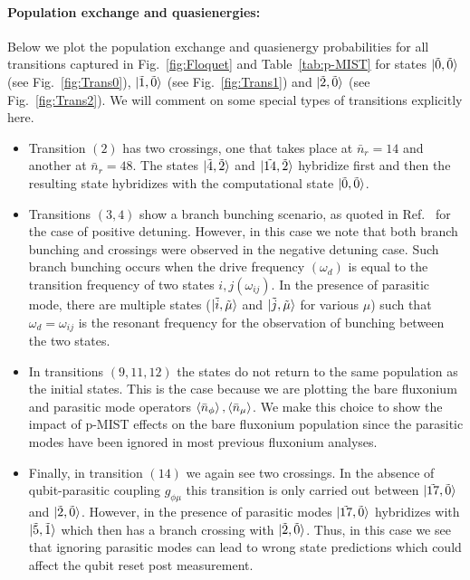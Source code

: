 \documentclass[%
reprint,
superscriptaddress,
 amsmath,amssymb,
 aps,
 prx,
longbibliography,
floatfix,
]{revtex4-2}
\begin{document}
\paragraph{Population exchange and quasienergies:}\label{app:Floquet-trans}
Below we plot the population exchange and quasienergy probabilities for all transitions captured in Fig.~\ref{fig:Floquet} and Table~\ref{tab:p-MIST} for states $\ket{\tilde{0},\tilde{0}}$ (see Fig.~\ref{fig:Trans0}), $\ket{\tilde{1},\tilde{0}}$ (see Fig.~\ref{fig:Trans1}) and $\ket{\tilde{2},\tilde{0}}$ (see Fig.~\ref{fig:Trans2}). We will comment on some special types of transitions explicitly here.

\begin{itemize}
    \item Transition $(2)$ has two crossings, one that takes place at $\bar n_r=14$ and another at $\bar n_r=48$. The states $\ket{\tilde{4},\tilde{2}}$ and $\ket{\tilde{14},\tilde{2}}$ hybridize first and then the resulting state hybridizes with the computational state $\ket{\tilde{0},\tilde{0}}$.
    \item Transitions $(3,4)$ show a branch bunching scenario, as quoted in Ref.~\cite{dumas2024unified} for the case of positive detuning. However, in this case we note that both branch bunching and crossings were observed in the negative detuning case. Such branch bunching occurs when the drive frequency $(\omega_d)$ is equal to the transition frequency of two states $i,j (\omega_{ij})$. In the presence of parasitic mode, there are multiple states ($\ket{\tilde{i},\tilde{\mu
    }}$ and $\ket{\tilde{j},\tilde{\mu}}$ for various $\mu$) such that $\omega_d=\omega_{ij}$ is the resonant frequency for the observation of bunching between the two states.
    \item In transitions $(9,11,12)$ the states do not return to the same population as the initial states. This is the case because we are plotting the bare fluxonium and parasitic mode operators $\braket{\bar n_\phi},\braket{\bar n_\mu}$. We make this choice to show the impact of p-MIST effects on the bare fluxonium population since the parasitic modes have been ignored in most previous fluxonium analyses.
    \item Finally, in transition $(14)$ we again see two crossings. In the absence of qubit-parasitic coupling $g_{\phi\mu}$ this transition is only carried out between  $\ket{\tilde{17},\tilde{0}}$ and $\ket{\tilde{2},\tilde{0}}$. However, in the presence of parasitic modes $\ket{\tilde{17},\tilde{0}}$ hybridizes with $\ket{\tilde{5},\tilde{1}}$ which then has a branch crossing with $\ket{\tilde{2},\tilde{0}}$. Thus, in this case we see that ignoring parasitic modes can lead to wrong state predictions which could affect the qubit reset post measurement.
\end{itemize}
\end{document}
